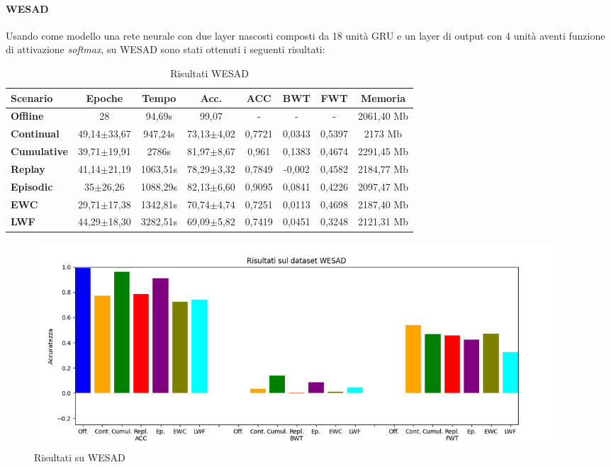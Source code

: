\paragraph{WESAD} Usando come modello una rete neurale con due layer nascosti composti da 18 unità GRU e un layer di output con 4 unità aventi funzione di attivazione \textit{softmax}, su WESAD sono stati ottenuti i seguenti risultati:
\pagebreak
\begin{table}[h]
\footnotesize
    \begin{tabular}{l|c|c|c|c|c|c|c}
        \textbf{Scenario} & \textbf{Epoche} & \textbf{Tempo} & \textbf{Acc.} & \textbf{ACC} & \textbf{BWT} & \textbf{FWT} & \textbf{Memoria}\\
        \hline
        \textbf{Offline} & 28 & 94,69s & 99,07 & - & - & - & 2061,40 Mb\\
        \textbf{Continual} & 49,14$\pm$33,67 & 947,24s & 73,13$\pm$4,02 & 0,7721 & 0,0343 & 0,5397 & 2173 Mb\\
        \textbf{Cumulative} & 39,71$\pm$19,91 & 2786s & 81,97$\pm$8,67 & 0,961 & 0,1383 & 0,4674 & 2291,45 Mb\\
        \textbf{Replay} & 41,14$\pm$21,19 & 1063,51s & 78,29$\pm$3,32 & 0,7849 & -0,002 & 0,4582 & 2184,77 Mb\\
        \textbf{Episodic} & 35$\pm$26,26 & 1088,29s & 82,13$\pm$6,60 & 0,9095 & 0,0841 & 0,4226 & 2097,47 Mb\\
        \textbf{EWC} & 29,71$\pm$17,38 & 1342,81s & 70,74$\pm$4,74 & 0,7251 & 0,0113 & 0,4698 & 2187,40 Mb\\
        \textbf{LWF} & 44,29$\pm$18,30 & 3282,51s & 69,09$\pm$5,82 & 0,7419 & 0,0451 & 0,3248 & 2121,31 Mb\\
    \end{tabular}
    \caption{Risultati WESAD}
    \label{tab:reswesad}
\end{table}
\begin{figure}[h]
	\begin{center}
		\includegraphics[width=0.95\textwidth]{img/graphs/wesad_final_metrics.png}
		\caption{Risultati su WESAD}
		\label{fig:wesad_metrics_graph}
	\end{center}
\end{figure}
